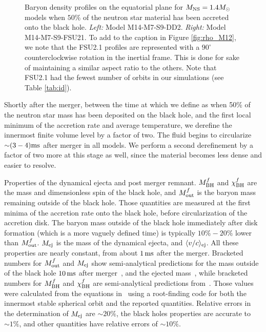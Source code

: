 \begin{figure}
\begin{subfigure}[b]{0.475\textwidth}
		\label{fig:rho_M14_FSU21}
		\centering
	\end{subfigure}
	\caption[Density profiles on equatorial plane for $1.4 M_{\odot}$ models]{
	Baryon density profiles on the equatorial plane for $M_{\rm NS} = 1.4 M_{\odot}$ models when $50\%$ of the neutron star material has been accreted onto the black hole.
	\textit{Left:} Model M14-M7-S9-DD2.
	\textit{Right:} Model M14-M7-S9-FSU21.
	To add to the caption in Figure \ref{fig:rho_M12}, we note that the FSU2.1 profiles are represented with a $90^{\circ}$ counterclockwise rotation in the inertial frame.  This is done for sake of maintaining a similar aspect ratio to the others.  Note that FSU2.1 had the fewest number of orbits in our simulations (see Table \ref{tab:id}). 
	}
	\label{fig:rho_M14}
\end{figure}

Shortly after the merger, between the time at which we define as when 50\% of the neutron star mass has been deposited on the black hole, and the first local minimum of the accretion rate and average temperature, we derefine the innermost finite volume level by a factor of two.
The fluid begins to circularize $\mathord{\sim} (3-4) {\rm ms}$ after merger in all models.
We perform a second derefinement by a factor of two more at 
this stage as well, since the material becomes less dense and easier to resolve.



\begin{table}
	\begin{center}
		\caption[Properties of the dynamical ejecta and post merger remnant]{
			Properties of the dynamical ejecta and post merger remnant. $M_{\rm BH}^f$ and  $\chi_{\rm BH}^f$  are the mass and dimensionless spin of the black hole,
			and $M_{\rm out}^f$ is the baryon mass remaining outside of the black hole. Those quantities are measured at the first minima of the accretion rate onto the black hole,
			before circularization of the accretion disk. The baryon mass outside of the black hole immediately after disk formation (which is a more vaguely defined
			time) is typically $10\%-20\%$ lower than $M_{\rm out}^f$. $M_{\rm ej}$ is the mass of the dynamical ejecta, and $\langle v/c\rangle_{\rm ej}$. All these properties are nearly constant, from about $1\,{\rm ms}$ after the merger. Bracketed numbers for
			$M_{\rm out}^f$ and $M_{\rm ej}$ show semi-analytical predictions for the mass outside of the black hole $10\,{\rm ms}$ after merger~\cite{Foucart2012},
			and the ejected mass~\cite{Kawaguchi:2016}, while bracketed numbers for $M_{\rm BH}^f$ and $\chi_{\rm BH}^f$ are semi-analytical predictions
			from~\cite{Pannarale:2014}. Those values were calculated from the equations in~\cite{Pannarale:2014} using a root-finding code for both the innermost stable spherical orbit and the reported quantities.  Relative errors in the determination of $M_{\rm ej}$ are $\sim 20\%$, the black holes properties are
			accurate to $\sim 1\%$, and other quantities have relative errors of $\sim 10\%$.
		}
		\label{tab:results}
		{
			
		}
	\end{center}
\end{table}



